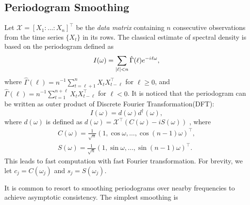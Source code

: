 \subsection{Periodogram Smoothing}
Let  $\mathcal{X} = [X_1:\ldots:X_n]^\top$  be the \textit{data matrix} containing $n$ consecutive observations from the time series $\{X_t\}$ in its rows. The classical estimate of spectral density is based on the periodogram \citep{brockwell2013time, rosenblatt1985stationary} defined as
\begin{equation}
\label{eq:single_periodogram}
I(\omega)=\sum_{|\ell|<n} \hat{\Gamma}(\ell)e^{-{i\mkern1mu}\ell\omega},
\end{equation}
where $\hat{\Gamma}(\ell) = n^{-1}\sum_{t=\ell+1}^{n} X_t X_{t-\ell}^\top$ for $\ell\ge 0$, and 
 $\hat{\Gamma}(\ell) = n^{-1}\sum_{t=1}^{n+\ell} X_t X_{t-\ell}^\top$ for $\ell<0$. It is noticed that the periodogram can be written as outer product of 
Discrete Fourier Transformation(DFT): 
\[
I(\omega) = d(\omega) d^\dag(\omega), 
\]
where $d(\omega)$ is defined as $d(\omega) = \mathcal{X}^\top(C(\omega)-iS(\omega))$ , where 
\begin{equation}
\label{eq:cos_sin_coef}
\begin{aligned}
C(\omega) = \frac{1}{\sqrt{n}} (1, \cos \omega, \dots, \cos (n-1)\omega)^\top,\\
S(\omega) = \frac{1}{\sqrt{n}} (1, \sin \omega, \dots, \sin (n-1)\omega)^\top.
\end{aligned}
\end{equation}
This leads to fast computation with fast Fourier transformation. For brevity,  we let $c_j = C(\omega_j)$ and $s_j = S(\omega_j)$. 
 
It is common to resort to smoothing periodograms over nearby frequencies to achieve asymptotic consistency. The simplest smoothing is 


